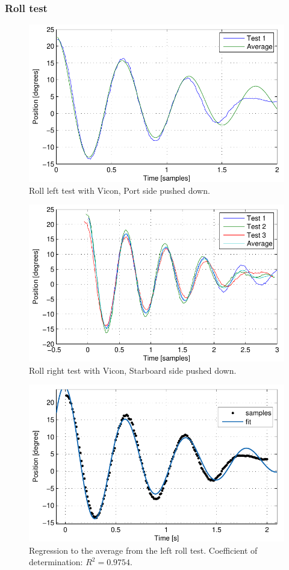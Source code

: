 \subsubsection{Roll test}
\begin{figure}[H]
	\centering
	\includegraphics{plot/rltest}
	\caption{Roll left test with Vicon, Port side pushed down.}
	\label{fig:rltest}
\end{figure}
\begin{figure}[H]
	\centering
	\includegraphics{plot/rrtest}
	\caption{Roll right test with Vicon, Starboard side pushed down.}
	\label{fig:rrtest}
\end{figure}
\begin{figure}[H]
	\centering
	\includegraphics{plot/gns_rl}
	\caption{Regression to the average from the left roll test. Coefficient of determination: $R^2 = 0.9754$.}
	\label{fig:gnsrl}
\end{figure}
